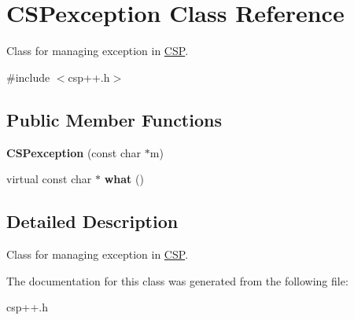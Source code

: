 \hypertarget{classCSPexception}{
\section{CSPexception Class Reference}
\label{classCSPexception}
}


Class for managing exception in \hyperlink{classCSP}{CSP}.  




{\ttfamily \#include $<$csp++.h$>$}

\subsection*{Public Member Functions}
\begin{DoxyCompactItemize}
\item 
\hypertarget{classCSPexception_a810bcfbb11d2e35d7b95f1e2b11b408c}{
{\bfseries CSPexception} (const char $\ast$m)}
\label{classCSPexception_a810bcfbb11d2e35d7b95f1e2b11b408c}

\item 
\hypertarget{classCSPexception_a7013e90a6c26ba4c15bc6fbc42be02ef}{
virtual const char $\ast$ {\bfseries what} ()}
\label{classCSPexception_a7013e90a6c26ba4c15bc6fbc42be02ef}

\end{DoxyCompactItemize}


\subsection{Detailed Description}
Class for managing exception in \hyperlink{classCSP}{CSP}. 

The documentation for this class was generated from the following file:\begin{DoxyCompactItemize}
\item 
csp++.h\end{DoxyCompactItemize}
